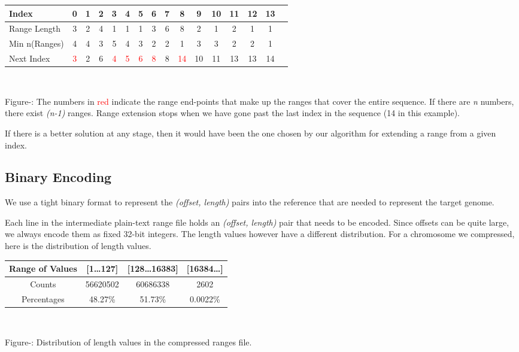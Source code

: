 \documentclass[11pt]{article}
\newcounter{fignum}
\begin{document}
\begin{center}
  \begin{tabular}{|l|c|c|c|c|c|c|c|c|c|c|c|c|c|c|c|}
    \hline
    Index         & 0 & 1 & 2 & 3 & 4 & 5 & 6 & 7 & 8 & 9 &10 &11 &12 &13\\
    \hline
    Range Length  & 3 & 2 & 4 & 1 & 1 & 1 & 3 & 6 & 8 & 2 & 1 & 2 & 1 & 1\\
    \hline
    Min n(Ranges) & 4 & 4 & 3 & 5 & 4 & 3 & 2 & 2 & 1 & 3 & 3 & 2 & 2 & 1\\
    \hline
    Next Index    & \textcolor{red}{3} & 2 & 6 & \textcolor{red}{4} & \textcolor{red}{5} & \textcolor{red}{6} & \textcolor{red}{8} & 8 & \textcolor{red}{14} &10 &11 &13 &13 &14\\
    \hline
  \end{tabular}\\
  \vspace{0.3cm}

  \footnotesize{Figure-: The numbers in
    \textcolor{red}{red} indicate the range end-points that make up
    the ranges that cover the entire sequence. If there are \textit{n}
    numbers, there exist \textit{(n-1)} ranges. Range extension stops
    when we have gone past the last index in the sequence (14 in this
    example).}

  \addtocounter{fignum}{1}
\end{center}

If there is a better solution at any stage, then it would have been
the one chosen by our algorithm for extending a range from a given
index.

\subsection{Binary Encoding}

We use a tight binary format to represent the \textit{(offset,
  length)} pairs into the reference that are needed to represent the
target genome.

Each line in the intermediate plain-text range file holds an
\textit{(offset, length)} pair that needs to be encoded. Since offsets
can be quite large, we always encode them as fixed 32-bit
integers. The length values however have a different distribution. For
a chromosome we compressed, here is the distribution of length values.

\begin{center}
  \begin{tabular}{|c|c|c|c|}
    \hline
    Range of Values & [1\ldots{}127] & [128\ldots{}16383] & [16384\ldots{}]\\
    \hline
    Counts & 56620502 & 60686338 & 2602\\
    \hline
    Percentages & 48.27\% & 51.73\% & 0.0022\%\\
    \hline
  \end{tabular}\\
  \vspace{0.3cm}

  \footnotesize{Figure-: Distribution of length values
    in the compressed ranges file.}

  \addtocounter{fignum}{1}
\end{center}
\end{document}
